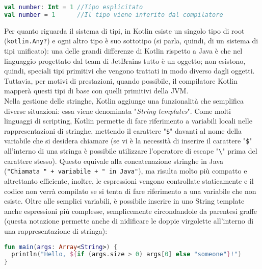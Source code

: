 \begin{lstlisting}[caption={Inferenza di tipo}, captionpos=b, label={lst:exampleInferenzaDiTipo}, language=Kotlin]
val number: Int = 1 //Tipo esplicitato
val number = 1      //Il tipo viene inferito dal compilatore
\end{lstlisting}

Per quanto riguarda il sistema di tipi, in Kotlin esiste un singolo tipo di root (\texttt{kotlin.Any?}) e ogni altro tipo è suo sottotipo (si parla, quindi, di un sistema di tipi unificato): una delle grandi differenze di Kotlin rispetto a Java è che nel linguaggio progettato dal team di JetBrains tutto è un oggetto; non esistono, quindi, speciali tipi primitivi che vengono trattati in modo diverso dagli oggetti. Tuttavia, per motivi di prestazioni, quando possibile, il compilatore Kotlin mapperà questi tipi di base con quelli primitivi della JVM.\\

Nella gestione delle stringhe, Kotlin aggiunge una funzionalità che semplifica diverse situazioni: essa viene denominata "{\em String templates}". Come molti linguaggi di scripting, Kotlin permette di fare riferimento a variabili locali nelle rappresentazioni di stringhe, mettendo il carattere "\texttt{\$}" davanti al nome della variabile che si desidera chiamare (se vi è la necessità di inserire il carattere "\texttt{\$}" all’interno di una stringa è possibile utilizzare l’operatore di escape "\texttt{\textbackslash}" prima del carattere stesso). Questo equivale alla concatenazione stringhe in Java (\texttt{"Chiamata " + variabile + " in Java"}), ma risulta molto più compatto e altrettanto efficiente, inoltre, le espressioni vengono controllate staticamente e il codice non verrà compilato se si tenta di fare riferimento a una variabile che non esiste. Oltre alle semplici variabili, è possibile inserire in uno String template anche espressioni più complesse, semplicemente circondandole da parentesi graffe (questa notazione permette anche di nidificare le doppie virgolette all’interno di una rappresentazione di stringa):\\

\begin{lstlisting}[caption={String Template}, captionpos=b, label={lst:exampleStringTemplate}, language=Kotlin]
fun main(args: Array<String>) {
  println("Hello, ${if (args.size > 0) args[0] else "someone"}!")
}
\end{lstlisting}

